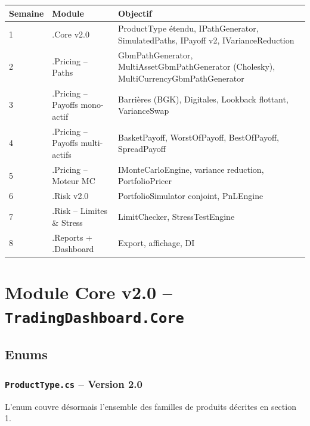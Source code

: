 \documentclass[a4paper,11pt]{article}
\begin{document}
\begin{center}
\begin{tabularx}{\textwidth}{l l X}
\toprule
\textbf{Semaine} & \textbf{Module} & \textbf{Objectif} \\
\midrule
1   & .Core v2.0       & ProductType \'etendu, IPathGenerator, SimulatedPaths, IPayoff v2, IVarianceReduction \\
2   & .Pricing -- Paths & GbmPathGenerator, MultiAssetGbmPathGenerator (Cholesky), MultiCurrencyGbmPathGenerator \\
3   & .Pricing -- Payoffs mono-actif & Barrières (BGK), Digitales, Lookback flottant, VarianceSwap \\
4   & .Pricing -- Payoffs multi-actifs & BasketPayoff, WorstOfPayoff, BestOfPayoff, SpreadPayoff \\
5   & .Pricing -- Moteur MC & IMonteCarloEngine, variance reduction, PortfolioPricer \\
6   & .Risk v2.0       & PortfolioSimulator conjoint, PnLEngine \\
7   & .Risk -- Limites \& Stress & LimitChecker, StressTestEngine \\
8   & .Reports + .Dashboard & Export, affichage, DI \\
\bottomrule
\end{tabularx}
\end{center}

\newpage
\section{Module Core v2.0 -- \texttt{TradingDashboard.Core}}

\subsection{Enums}

\subsubsection{\texttt{ProductType.cs} -- Version 2.0}

L'enum couvre d\'esormais l'ensemble des familles de produits d\'ecrites en section 1.
\end{document}
